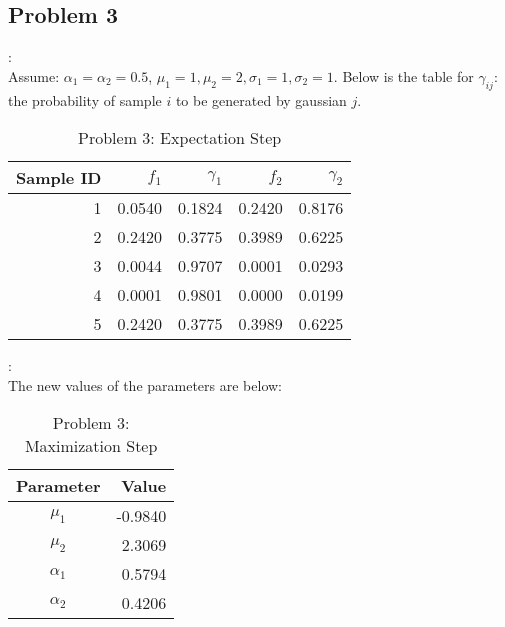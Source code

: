 \documentclass[11pt]{extarticle} %
\begin{document}
\subsection*{Problem 3}
: \\
Assume: $\alpha_1 = \alpha_2 = 0.5$, $\mu_1=1, \mu_2=2, \sigma_1=1, \sigma_2=1$. Below is the table for $\gamma_{ij}$: the probability of sample $i$ to be generated by gaussian $j$.
\begin{table}[H]
\centering
\begin{tabular}{r||rr||rr}
\hline
Sample ID & $f_1$ & $\gamma_1$ & $f_2$ & $\gamma_2$ \\ 
\hline
1 & 0.0540 & 0.1824 & 0.2420 & 0.8176 \\
2 & 0.2420 & 0.3775 & 0.3989 & 0.6225 \\
3 & 0.0044 & 0.9707 & 0.0001 & 0.0293 \\
4 & 0.0001 & 0.9801 & 0.0000 & 0.0199 \\
5 & 0.2420 & 0.3775 & 0.3989 & 0.6225 \\
\hline
\end{tabular}
\caption{Problem 3: Expectation Step}
\end{table}
: \\
The new values of the parameters are below:
\begin{table}[H]
\centering
\begin{tabular}{c||r}
\hline
Parameter & Value \\ 
\hline
$\mu_1$ & -0.9840 \\
$\mu_2$ & 2.3069 \\
$\alpha_1$ & 0.5794 \\
$\alpha_2$ & 0.4206 \\
\hline
\end{tabular}
\caption{Problem 3: Maximization Step}
\end{table}
\end{document}
